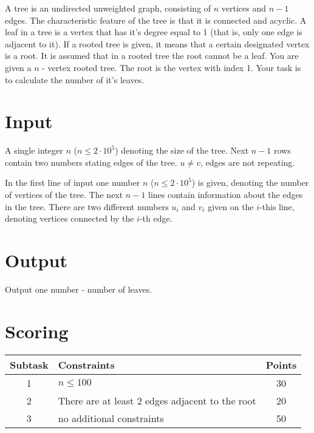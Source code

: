 \documentclass{spiral}
\begin{document}
    \makeheader

    A tree is an undirected unweighted graph,
    consisting of $n$ vertices and $n-1$ edges.
    The characteristic feature of the tree is that it is connected and acyclic.
    A leaf in a tree is a vertex that has it's degree equal to 1
    (that is, only one edge is adjacent to it).
    If a rooted tree is given, it means that a certain designated vertex is a root.
    It is assumed that in a rooted tree the root cannot be a leaf.
    You are given a $n$ - vertex rooted tree.
    The root is the vertex with index 1.
    Your task is to calculate the number of it's leaves.

\section{Input}

    A single integer $n$ ($n \leq 2 \cdot 10^5$) denoting the size of the tree.
    Next $n-1$ rows contain two numbers stating edges of the tree.
    $u \neq v$, edges are not repeating.

    In the first line of input one number $n$ ($n \leq 2 \cdot 10^5$) is given,
    denoting the number of vertices of the tree.
    The next $n-1$ lines contain information about the edges in the tree.
    There are two different numbers $u_i$ and $v_i$ given on the $i$-this line,
    denoting vertices connected by the $i$-th edge.

\section{Output}

    Output one number - number of leaves.


\section{Scoring}

    \begin{center}
        \begin{tabular}{|c|p{5cm}|c|}
            \hline
            \textbf{Subtask} & \textbf{Constraints} & \textbf{Points} \\
            \hline
            1 & $n \leq 100$ & 30 \\
            \hline
            2 & There are at least 2 edges adjacent to the root & 20 \\
            \hline
            3 & no additional constraints & 50 \\
            \hline
        \end{tabular}
    \end{center}
\end{document}
